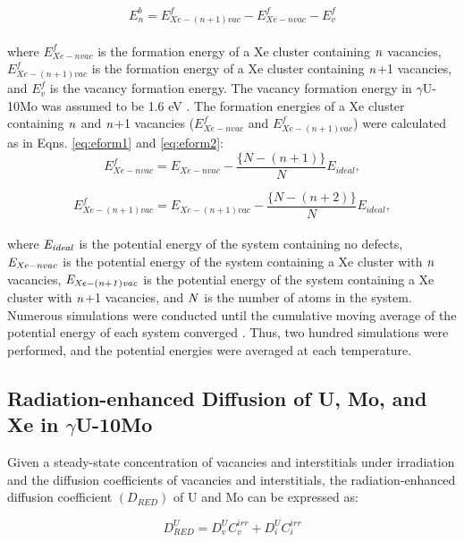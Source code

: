 \documentclass[preprint,12pt]{elsarticle}
\begin{document}
\begin{equation}
\label{eq:be}
E^{b}_{n} = E^{f}_{Xe-(n+1)vac} - E^{f}_{Xe-nvac} - E^{f}_{v}
\end{equation}
\\
\noindent where $E^{f}_{Xe-nvac}$ is the formation energy of a Xe cluster containing $\it{n}$ vacancies, $E^{f}_{Xe-(n+1)vac}$ is the formation energy of a Xe cluster containing $\it{n}$+1 vacancies, and $E^{f}_{v}$ is the vacancy formation energy. The vacancy formation energy in $\gamma$U-10Mo was assumed to be 1.6 eV \cite{beeler2020improved}. The formation energies of a Xe cluster containing $\it{n}$ and $\it{n}$+1 vacancies ($E_{Xe-nvac}^{f}$ and $E_{Xe-(n+1)vac}^{f}$) were calculated as in Eqns. \ref{eq:eform1} and \ref{eq:eform2}:\\

\begin{equation}
\label{eq:eform1}
E_{Xe-nvac}^{f} = E_{Xe-nvac} - \frac{\{N-(n+1)\}}{N}E_{ideal}, 
\end{equation}

\begin{equation}
\label{eq:eform2}
E_{Xe-(n+1)vac}^{f} = E_{Xe-(n+1)vac} - \frac{\{N-(n+2)\}}{N}E_{ideal}, 
\end{equation}
\\
\noindent where $\it{E}_{ideal}$ is the potential energy of the system containing no defects, $\it{E}_{Xe-nvac}$ is the potential energy of the system containing a Xe cluster with $\it{n}$ vacancies, $\it{E}_{Xe-(n+1)vac}$ is the potential energy of the system containing a Xe cluster with $\it{n}$+1 vacancies, and $\it{N}$ is the number of atoms in the system. Numerous simulations were conducted until the cumulative moving average of the potential energy of each system converged \cite{park2021atomistic}. Thus, two hundred simulations were performed, and the potential energies were averaged at each temperature.

\subsection{Radiation-enhanced Diffusion of U, Mo, and Xe in $\gamma$U-10Mo}
Given a steady-state concentration of vacancies and interstitials under irradiation and the diffusion coefficients of vacancies and interstitials, the radiation-enhanced diffusion coefficient $(D_{RED})$ of U and Mo can be expressed as:

\begin{equation}
D_{RED}^{U}= D_{v}^{U}C_{v}^{irr} + D_{i}^{U}C_{i}^{irr}
\end{equation}
\end{document}
